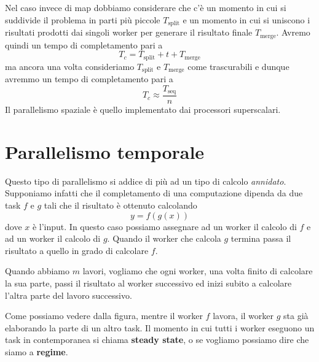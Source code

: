 Nel caso invece di map dobbiamo considerare che c'è un momento in cui si suddivide il problema in
parti più piccole $T_\text{split}$ e un momento in cui si uniscono i risultati prodotti dai singoli
worker per generare il risultato finale $T_\text{merge}$. Avremo quindi un tempo di completamento
pari a
\[ T_c = T_\text{split} + t + T_\text{merge} \]
ma ancora una volta consideriamo $T_\text{split}$ e $T_\text{merge}$ come trascurabili e dunque
avremmo un tempo di completamento pari a
\[ T_c \approx \frac{T_\text{seq}}{n} \]
Il parallelismo spaziale è quello implementato dai processori superscalari.

\section{Parallelismo temporale}
Questo tipo di parallelismo si addice di più ad un tipo di calcolo \emph{annidato}. Supponiamo
infatti che il completamento di una computazione dipenda da due task $f$ e $g$ tali che il risultato
è ottenuto calcolando
\[ y = f(g(x)) \]
dove $x$ è l'input. In questo caso possiamo assegnare ad un worker il calcolo di $f$ e ad un worker
il calcolo di $g$. Quando il worker che calcola $g$ termina passa il risultato a quello in grado di
calcolare $f$.

Quando abbiamo $m$ lavori, vogliamo che ogni worker, una volta finito di calcolare la sua parte,
passi il risultato al worker successivo ed inizi subito a calcolare l'altra parte del lavoro
successivo.
\begin{center}
\end{center}
Come possiamo vedere dalla figura, mentre il worker $f$ lavora, il worker $g$ sta già elaborando
la parte di un altro task. Il momento in cui tutti i worker eseguono un task in contemporanea si
chiama \textbf{steady state}, o se vogliamo possiamo dire che siamo a \textbf{regime}.

